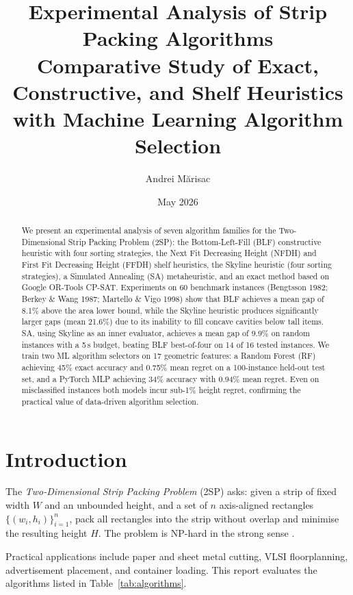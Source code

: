 \documentclass[11pt,a4paper]{article}
\title{\textbf{Experimental Analysis of Strip Packing Algorithms}\\[0.4em]
       \large Comparative Study of Exact, Constructive, and Shelf Heuristics\\
       with Machine Learning Algorithm Selection}
\author{Andrei Mărisac}
\affil{Facultatea de Informatică\\Universitatea Alexandru-Ioan Cuza Iași}
\affil{}
\date{May 2026}
\begin{document}
\maketitle
\tableofcontents
\bigskip

\begin{abstract}
We present an experimental analysis of seven algorithm families for the
Two-Dimensional Strip Packing Problem (2SP): the Bottom-Left-Fill (BLF)
constructive heuristic with four sorting strategies, the Next Fit Decreasing
Height (NFDH) and First Fit Decreasing Height (FFDH) shelf heuristics,
the Skyline heuristic (four sorting strategies), a Simulated Annealing (SA)
metaheuristic, and an exact method based on Google OR-Tools CP-SAT.
Experiments on 60 benchmark instances (Bengtsson 1982; Berkey \& Wang 1987;
Martello \& Vigo 1998) show that BLF achieves a mean gap of 8.1\% above the
area lower bound, while the Skyline heuristic produces significantly larger gaps
(mean 21.6\%) due to its inability to fill concave cavities below tall items.
SA, using Skyline as an inner evaluator, achieves a mean gap of 9.9\%
on random instances with a 5\,s budget, beating BLF best-of-four on 14 of 16
tested instances.
We train two ML algorithm selectors on 17 geometric features: a Random Forest
(RF) achieving 45\% exact accuracy and 0.75\% mean regret on a 100-instance
held-out test set, and a PyTorch MLP achieving 34\% accuracy with 0.94\%
mean regret.
Even on misclassified instances both models incur sub-1\% height regret,
confirming the practical value of data-driven algorithm selection.
\end{abstract}

\section{Introduction}

The \emph{Two-Dimensional Strip Packing Problem} (2SP) asks: given a strip of
fixed width \(W\) and an unbounded height, and a set of \(n\)
axis-aligned rectangles \(\{(w_i, h_i)\}_{i=1}^{n}\), pack all rectangles
into the strip without overlap and minimise the resulting height \(H\).
The problem is NP-hard in the strong sense \cite{GareyJohnson1979}.

Practical applications include paper and sheet metal cutting, VLSI floorplanning,
advertisement placement, and container loading.
This report evaluates the algorithms listed in Table~\ref{tab:algorithms}.
\end{document}
